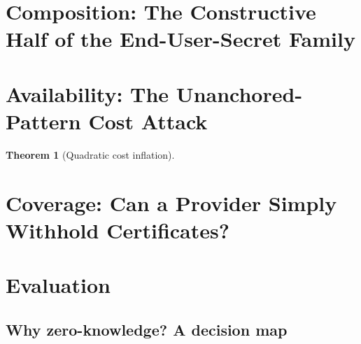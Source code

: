 \documentclass[journal]{IEEEtran}
\newtheorem{theorem}{Theorem}
\newcommand{\need}[1]{}
\newcommand{\fixme}[1]{}
\newcommand{\need}[1]{\textcolor{blue}{[[ NEED: #1 ]]}}
\newcommand{\fixme}[1]{\textcolor{orange}{[[ FIX: #1 ]]}}
\begin{document}
\section{Composition: The Constructive Half of the End-User-Secret Family}
\label{sec:composition}

\fixme{关键更正：组合本身不闭合缺口。只有当模型证明绑定到\emph{用户提交的
输入} $x$ 时，$M(x) = T \wedge \pi(T)$ 才真的闭合"送错字节"——而那恰好是
Theorem \ref{thm:t3} 要求的 $f > 0$：用户提交的 $x$ 就是那 $f$ 个新鲜比特。}

\need{组合契约的定义（模型证明须暴露什么，策略证明才能绑上）；
真模型规模（$\ge 10^6$ 参数）；成本数据。}

\section{Availability: The Unanchored-Pattern Cost Attack}
\label{sec:dos}

\begin{theorem}[Quadratic cost inflation]
\need{对含未锚定模式的正则，控制响应的对手可强制 $\Omega(n^2)$ 证明工作量。}
\end{theorem}

\need{缓解：Pike VM（已有）+ 响应长度承诺 + 分块匹配。
zk-regex 有 DFA 限制但没有 zkVM 场景下的 DoS 分析——这是新的。}

\section{Coverage: Can a Provider Simply Withhold Certificates?}
\label{sec:coverage}

\section{Evaluation}
\label{sec:eval}

\need{矩阵：规则 \{1,2,3,4,6,8\} $\times$ 长度 \{200, 2k, 10k, 50k\}
$\times$ 模式 \{transparent, private, private-policy\}
$\times$ 证明档 \{core, groth16\}。
骨架见 bench/bench_scale.py。}

\subsection{Why zero-knowledge? A decision map}
\end{document}
